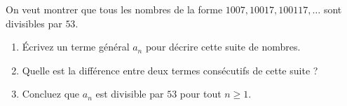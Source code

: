 On veut montrer que tous les nombres de la forme $1007, 10017, 100117, \ldots$
sont divisibles par $53$.
\begin{enumerate}
  \item Écrivez un terme général $a_n$ pour décrire cette suite de nombres.
  \item Quelle est la différence entre deux termes consécutifs de cette suite ?
  \item Concluez que $a_n$ est divisible par $53$ pour tout $n \geq 1$.
\end{enumerate}
